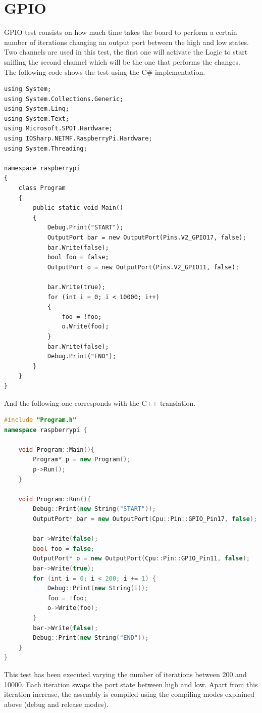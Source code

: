 \section{GPIO}\label{SS:IOEx-GPIO}
GPIO test consists on how much time takes the board to perform a certain number of iterations changing an output port between the high and low states. Two channels are used in this test, the first one will activate the Logic to start sniffing the second channel which will be the one that performs the changes.
\\
The following code shows the test using the C\# implementation.
\begin{lstlisting}[language=CSharp, caption={GPIO Performance test in C\#}]
using System;
using System.Collections.Generic;
using System.Linq;
using System.Text;
using Microsoft.SPOT.Hardware;
using IOSharp.NETMF.RaspberryPi.Hardware;
using System.Threading;

namespace raspberrypi
{
    class Program
    {
        public static void Main()
        {
            Debug.Print("START");
            OutputPort bar = new OutputPort(Pins.V2_GPIO17, false);
            bar.Write(false);
            bool foo = false;
            OutputPort o = new OutputPort(Pins.V2_GPIO11, false);

            bar.Write(true);
            for (int i = 0; i < 10000; i++)
            {
                foo = !foo;
                o.Write(foo);
            }
            bar.Write(false);
            Debug.Print("END");
        }
    }
}
\end{lstlisting}
And the following one corresponds with the C++ translation.
\begin{lstlisting}[language=C++, caption={GPIO Performance translated to C++}]
#include "Program.h"
namespace raspberrypi {

	void Program::Main(){
		Program* p = new Program();
		p->Run();
	}

	void Program::Run(){
		Debug::Print(new String("START"));
		OutputPort* bar = new OutputPort(Cpu::Pin::GPIO_Pin17, false);
	
		bar->Write(false);
		bool foo = false;
		OutputPort* o = new OutputPort(Cpu::Pin::GPIO_Pin11, false);
		bar->Write(true);
		for (int i = 0; i < 200; i += 1) {
			Debug::Print(new String(i));
			foo = !foo;
			o->Write(foo);
		}
		bar->Write(false);
		Debug::Print(new String("END"));
	}
}
\end{lstlisting}

This test has been executed varying the number of iterations between 200 and 10000. Each iteration swaps the port state between high and low. Apart from this iteration increase, the assembly is compiled using the compiling modes explained above (debug and release modes).


